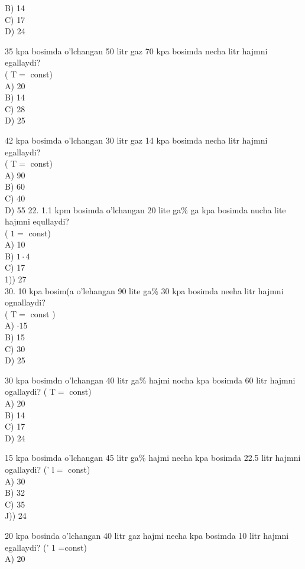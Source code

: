 B) 14\\
C) 17\\
D) 24
  \item 35 kpa bosimda o'lchangan 50 litr gaz 70 kpa bosimda necha litr hajmni egallaydi?\\
( $\mathrm{T}=$ const)\\
A) 20\\
B) 14\\
C) 28\\
D) 25
  \item 42 kpa bosimda o'lchangan 30 litr gaz 14 kpa bosimda necha litr hajmni egallaydi?\\
( $\mathrm{T}=$ const)\\
A) 90\\
B) 60\\
C) 40\\
D) 55
22. 1.1 kpm bosimda o'lchangan 20 lite ga\% ga kpa bosimda nucha lite hajmni equllaydi?\\
( $1=$ const)\\
A) 10\\
B) $1 \cdot 4$\\
C) 17\\
1)) 27\\
30. 10 kpa bosim(a o'lehangan 90 lite ga\% 30 kpa bosimda neeha litr hajmni ognallaydi?\\
( $\mathrm{T}=$ const )\\
A) $\cdot 15$\\
B) 15\\
C) 30\\
D) 25
  \item 30 kpa bosimdn o'lchangan 40 litr ga\% hajmi nocha kpa bosimda 60 litr hajmni ogallaydi? ( $\mathrm{T}=$ const)\\
A) 20\\
B) 14\\
C) 17\\
D) 24\\
  \item 15 kpa bosimda o'lchangan 45 litr ga\% hajmi necha kpa bosimda 22.5 litr hajmni ogallaydi? (' $\mathrm{l}=$ const)\\
A) 30\\
B) 32\\
C) 35\\
J)) 24
  \item 20 kpa bosinda o'lchangan 40 litr gaz hajmi necha kpa bosimda 10 litr hajmni egallaydi? (' 1 =const)\\
A) 20\\
